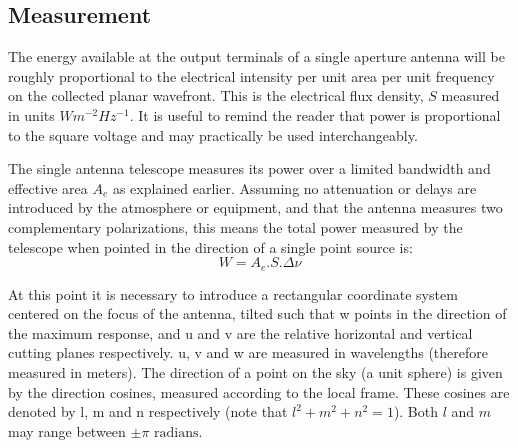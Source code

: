 \subsection{Measurement}
The energy available at the output terminals of a single aperture antenna will be roughly proportional to the electrical intensity per unit area per unit frequency on the 
collected planar wavefront. This is the electrical flux density, $S$ measured in units $Wm^{-2}Hz^{-1}$. It is useful to remind the reader that power is proportional to the square voltage and may 
practically be used interchangeably.

The single antenna telescope measures its power over a limited bandwidth and effective area $A_e$ as explained earlier. Assuming
no attenuation or delays are introduced by the atmosphere or equipment, and that the antenna measures two complementary polarizations, this 
means the total power measured by the telescope when pointed in the direction of a single point source is: 
\begin{equation*}
W = A_e.S.\Delta\nu
\end{equation*}

At this point it is necessary to introduce a rectangular coordinate system centered on the focus of the antenna, tilted such that w points 
in the direction of the maximum response, and u and v are the relative horizontal and vertical cutting planes respectively. u, v and w are 
measured in wavelengths (therefore measured in meters). The direction of a point on the sky (a unit sphere) is given by the 
direction cosines, measured according to the local frame. These cosines are denoted by l, m and n respectively (note that $l^2 + m^2 + n^2 = 1$). 
Both $l$ and $m$ may range between $\pm\pi \text{ radians}$.

